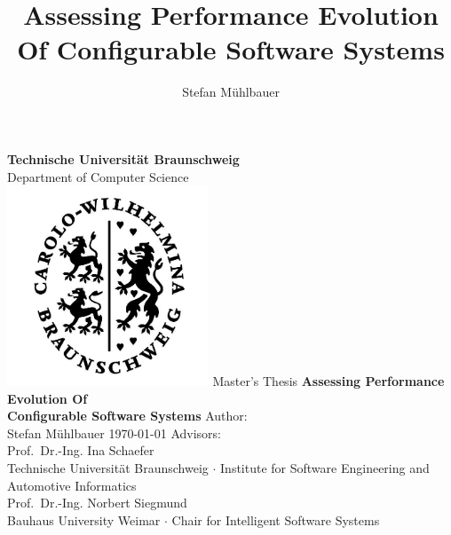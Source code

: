 \documentclass[
	12pt,
	a4paper,
	oneside,
	openright
]{book}
\title{Assessing Performance Evolution Of Configurable Software Systems}
\author{Stefan Mühlbauer}
\begin{document}
\newtheorem{definition}{Def.~}[section]

\begin{titlepage}
    \centering
    {
    	\textbf{Technische Universität Braunschweig}\\ 
    		\vspace{2mm}
    	Department of Computer Science
    }
    \vspace{1.5cm}\\
    \includegraphics[width=6cm]{images/SiegelTU.png}%
    \vfill
    Master's Thesis
    \vfill
    {\bfseries\Huge\linespread{2.0}
        Assessing Performance Evolution Of\\
        	\vspace{3mm}
         Configurable Software Systems
    }  
    \vfill
    {
    	Author:\\
    	\vspace{3mm}
    	{\Large Stefan Mühlbauer}
    }
    \vfill
    \today
    \vfill
    Advisors:\\
    \vspace{3mm}
    {\large Prof.~Dr.-Ing. Ina Schaefer}\\
    \vspace{1mm}
    {Technische Universität Braunschweig $\cdot$ Institute for Software
    Engineering and Automotive Informatics}\\
    \vspace{3mm}
    {\large Prof.~Dr.-Ing. Norbert Siegmund}\\
    \vspace{1mm}
    {Bauhaus University Weimar $\cdot$ Chair for Intelligent Software Systems}
\end{titlepage}

\frontmatter
\end{document}
